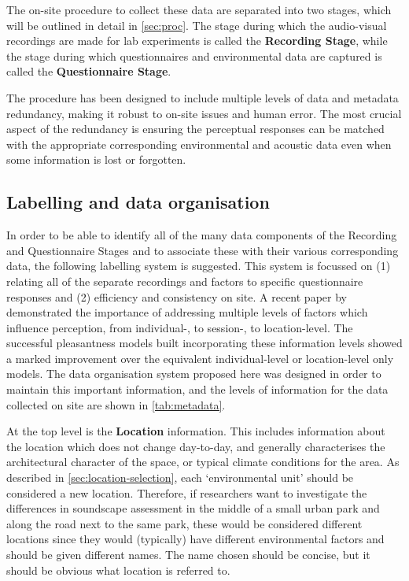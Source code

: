  The on-site procedure to collect these data are separated into two stages, which will be outlined in detail in \cref{sec:proc}. The stage during which the audio-visual recordings are made for lab experiments is called the \textbf{Recording Stage}, while the stage during which questionnaires and environmental data are captured is called the \textbf{Questionnaire Stage}.

 The procedure has been designed to include multiple levels of data and metadata redundancy, making it robust to on-site issues and human error. The most crucial aspect of the redundancy is ensuring the perceptual responses can be matched with the appropriate corresponding environmental and acoustic data even when some information is lost or forgotten.

 \subsection{Labelling and data organisation}
   \label{section:metadata}
   In order to be able to identify all of the many data components of the Recording and Questionnaire Stages and to associate these with their various corresponding data, the following labelling system is suggested. This system is focussed on (1) relating all of the separate recordings and factors to specific questionnaire responses and (2) efficiency and consistency on site. A recent paper by \citet{Aumond2017Modeling} demonstrated the importance of addressing multiple levels of factors which influence perception, from individual-, to session-, to location-level. The successful pleasantness models built incorporating these information levels showed a marked improvement over the equivalent individual-level or location-level only models. The data organisation system proposed here was designed in order to maintain this important information, and the levels of information for the data collected on site are shown in \cref{tab:metadata}.

   At the top level is the \textbf{Location} information. This includes information about the location which does not change day-to-day, and generally characterises the architectural character of the space, or typical climate conditions for the area. As described in \cref{sec:location-selection}, each `environmental unit' should be considered a new location. Therefore, if researchers want to investigate the differences in soundscape assessment in the middle of a small urban park and along the road next to the same park, these would be considered different locations since they would (typically) have different environmental factors and should be given different names. The name chosen should be concise, but it should be obvious what location is referred to.

